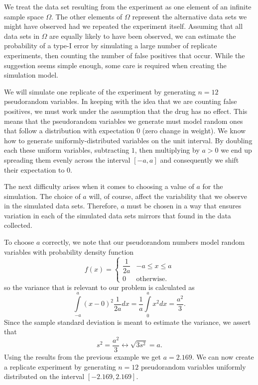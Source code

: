 \documentclass[../book.tex]{subfiles}
\begin{document}
\begin{solution}
We treat the data set resulting from the experiment as one element of an infinite sample space \(\Omega\). The other elements of \(\Omega\) represent the alternative data sets we might have observed had we repeated the experiment itself. Assuming that all data sets in \(\Omega\) are equally likely to have been observed, we can estimate the probability of a type-I error by simulating a large number of replicate experiments, then counting the number of false positives that occur. While the suggestion seems simple enough, some care is required when creating the simulation model.

We will simulate one replicate of the experiment by generating \(n=12\) pseudorandom variables. In keeping with the idea that we are counting false positives, we must work under the assumption that the drug has no effect. This means that the pseudorandom variables we generate must model random ones that follow a distribution with expectation \(0\) (zero change in weight). We know how to generate uniformly-distributed variables on the unit interval. By doubling each these uniform variables, subtracting \(1\), then multiplying by \(a>0\) we end up spreading them evenly across the interval \([-a,a]\) and consequently we shift their expectation to \(0\).

The next difficulty arises when it comes to choosing a value of \(a\) for the simulation. The choice of \(a\) will, of course, affect the variability that we observe in the simulated data sets. Therefore, \(a\) must be chosen in a way that ensures  variation in each of the simulated data sets mirrors that found in the data collected.

To choose \(a\) correctly, we note that our pseudorandom numbers model random variables with probability density function
\begin{equation}\label{eq:rv-24}
f(x)
=
\begin{cases}
    \dfrac{1}{2a} & -a \leq x \leq a \\[1ex]
    0 & \text{otherwise.}
\end{cases}
\end{equation}
so the variance that is relevant to our problem is calculated as
\begin{equation}\label{eq:rv-25}
\int\limits_{-a}^a ( x - 0 )^2  \frac{1}{2a}  dx
=
\frac{1}{a} \int\limits_0^a x^2 dx = \frac{a^2}{3}. 
\end{equation}
Since the sample standard deviation is meant to estimate the variance, we assert that
\begin{equation}\label{eq:rv-26}
s^2 = \frac{a^2}{3}
\leftrightarrow
\sqrt{3 s^2} = a.
\end{equation}
Using the results from the previous example we get \(a=2.169\). We can now create a replicate experiment by generating \(n=12\) pseudorandom variables uniformly distributed on the interval \([-2.169, 2.169]\).


\end{solution}
\end{document}
